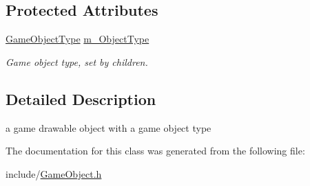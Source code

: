 \subsection*{Protected Attributes}
\begin{DoxyCompactItemize}
\item 
\hypertarget{class_game_object_a31b42727d57825d194e345cc30157401}{\hyperlink{_game_config_8h_a57678b60d65afb213d04a6b090c64a08}{Game\+Object\+Type} \hyperlink{class_game_object_a31b42727d57825d194e345cc30157401}{m\+\_\+\+Object\+Type}}\label{class_game_object_a31b42727d57825d194e345cc30157401}

\begin{DoxyCompactList}\small\item\em Game object type, set by children. \end{DoxyCompactList}\end{DoxyCompactItemize}


\subsection{Detailed Description}
a game drawable object with a game object type 

The documentation for this class was generated from the following file\+:\begin{DoxyCompactItemize}
\item 
include/\hyperlink{_game_object_8h}{Game\+Object.\+h}\end{DoxyCompactItemize}

